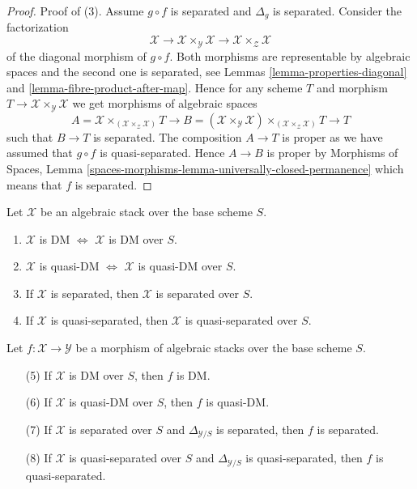 \begin{proof}
\medskip\noindent
Proof of (3). Assume $g \circ f$ is separated and $\Delta_g$ is
separated. Consider the factorization
$$
\mathcal{X} \to
\mathcal{X} \times_\mathcal{Y} \mathcal{X} \to
\mathcal{X} \times_\mathcal{Z} \mathcal{X}
$$
of the diagonal morphism of $g \circ f$. Both morphisms are
representable by algebraic spaces and the second one is separated, see
Lemmas \ref{lemma-properties-diagonal} and
\ref{lemma-fibre-product-after-map}.
Hence for any scheme $T$ and morphism
$T \to \mathcal{X} \times_\mathcal{Y} \mathcal{X}$
we get morphisms of algebraic spaces
$$
A = \mathcal{X} \times_{(\mathcal{X} \times_\mathcal{Z} \mathcal{X})} T
\longrightarrow
B = (\mathcal{X} \times_\mathcal{Y} \mathcal{X})
\times_{(\mathcal{X} \times_\mathcal{Z} \mathcal{X})} T
\longrightarrow
T
$$
such that $B \to T$ is separated.
The composition $A \to T$ is proper as we have assumed that
$g \circ f$ is quasi-separated. Hence $A \to B$ is proper by
Morphisms of Spaces,
Lemma \ref{spaces-morphisms-lemma-universally-closed-permanence}
which means that $f$ is separated.
\end{proof}

\begin{lemma}
\label{lemma-separated-implies-morphism-separated}
Let $\mathcal{X}$ be an algebraic stack over the base scheme $S$.
\begin{enumerate}
\item
$\mathcal{X}$ is DM $\Leftrightarrow$
$\mathcal{X}$ is DM over $S$.
\item
$\mathcal{X}$ is quasi-DM $\Leftrightarrow$
$\mathcal{X}$ is quasi-DM over $S$.
\item If $\mathcal{X}$ is separated, then
$\mathcal{X}$ is separated over $S$.
\item If $\mathcal{X}$ is quasi-separated, then
$\mathcal{X}$ is quasi-separated over $S$.
\end{enumerate}
Let $f : \mathcal{X} \to \mathcal{Y}$ be a morphism of algebraic stacks
over the base scheme $S$.
\begin{enumerate}
\item[(5)] If $\mathcal{X}$ is DM over $S$, then $f$ is DM.
\item[(6)] If $\mathcal{X}$ is quasi-DM over $S$, then $f$ is quasi-DM.
\item[(7)] If $\mathcal{X}$ is separated over $S$ and
$\Delta_{\mathcal{Y}/S}$ is separated, then $f$ is separated.
\item[(8)] If $\mathcal{X}$ is quasi-separated over $S$ and
$\Delta_{\mathcal{Y}/S}$ is quasi-separated, then $f$ is quasi-separated.
\end{enumerate}
\end{lemma}

